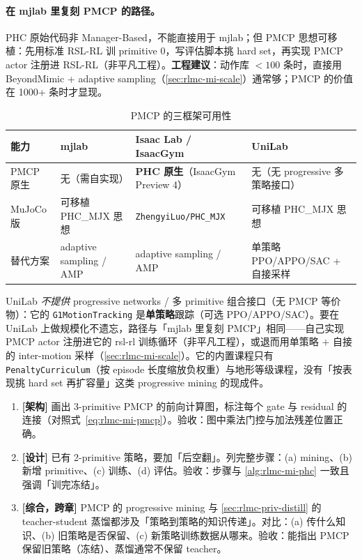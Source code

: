 \paragraph{在 mjlab 里复刻 PMCP 的路径。}PHC 原始代码非 Manager-Based，不能直接用于 mjlab；但 PMCP 思想可移植：先用标准 RSL-RL 训 primitive 0，写评估脚本挑 hard set，再实现 PMCP actor 注册进 RSL-RL（非平凡工程）。\textbf{工程建议}：动作库 $<100$ 条时，直接用 BeyondMimic + adaptive sampling（\cref{sec:rlmc-mi-scale}）通常够；PMCP 的价值在 1000+ 条时才显现。

\begin{table}[ht]
\centering
\small
\caption{PMCP 的三框架可用性}
\label{tab:rlmc-mi-pmcp3}
\begin{tabular}{@{}llll@{}}
\toprule
能力 & mjlab & Isaac Lab / IsaacGym & UniLab \\
\midrule
PMCP 原生 & 无（需自实现） & \textbf{PHC 原生}（IsaacGym Preview 4） & 无（无 progressive 多策略接口） \\
MuJoCo 版 & 可移植 PHC\_MJX 思想 & \verb|ZhengyiLuo/PHC_MJX| & 可移植 PHC\_MJX 思想 \\
替代方案 & adaptive sampling / AMP & adaptive sampling / AMP & 单策略 PPO/APPO/SAC + 自接采样 \\
\bottomrule
\end{tabular}
\end{table}

UniLab \emph{不提供} progressive networks / 多 primitive 组合接口（无 PMCP 等价物）：它的 \verb|G1MotionTracking| 是\textbf{单策略}跟踪（可选 PPO/APPO/SAC）。要在 UniLab 上做规模化不遗忘，路径与「mjlab 里复刻 PMCP」相同——自己实现 PMCP actor 注册进它的 rsl-rl 训练循环（非平凡工程），或退而用单策略 $+$ 自接的 inter-motion 采样（\cref{sec:rlmc-mi-scale}）。它的内置课程只有 \verb|PenaltyCurriculum|（按 episode 长度缩放负权重）与地形等级课程，没有「按表现挑 hard set 再扩容量」这类 progressive mining 的现成件。

\begin{practice}[本节练习]
\begin{enumerate}
  \item \textbf{[架构]} 画出 3-primitive PMCP 的前向计算图，标注每个 gate 与 residual 的连接（对照式~\eqref{eq:rlmc-mi-pmcp}）。验收：图中乘法门控与加法残差位置正确。
  \item \textbf{[设计]} 已有 2-primitive 策略，要加「后空翻」。列完整步骤：(a) mining、(b) 新增 primitive、(c) 训练、(d) 评估。验收：步骤与 \cref{alg:rlmc-mi-phc} 一致且强调「训完冻结」。
  \item \textbf{[综合，跨章]} PMCP 的 progressive mining 与 \cref{sec:rlmc-priv-distill} 的 teacher-student 蒸馏都涉及「策略到策略的知识传递」。对比：(a) 传什么知识、(b) 旧策略是否保留、(c) 新策略训练数据从哪来。验收：能指出 PMCP 保留旧策略（冻结）、蒸馏通常不保留 teacher。
\end{enumerate}
\end{practice}


